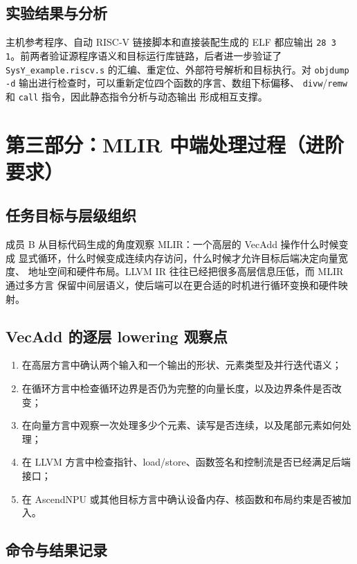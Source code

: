 \documentclass[a4paper]{article}
\begin{document}
\subsection{实验结果与分析}

主机参考程序、自动 RISC-V 链接脚本和直接装配生成的 ELF 都应输出
\texttt{28 3 1}。前两者验证源程序语义和目标运行库链路，后者进一步验证了
\texttt{SysY\_example.riscv.s} 的汇编、重定位、外部符号解析和目标执行。对
\texttt{objdump -d} 输出进行检查时，可以重新定位四个函数的序言、数组下标偏移、
\texttt{divw}/\texttt{remw} 和 \texttt{call} 指令，因此静态指令分析与动态输出
形成相互支撑。

\section{第三部分：MLIR 中端处理过程（进阶要求）}

\subsection{任务目标与层级组织}

成员 B 从目标代码生成的角度观察 MLIR：一个高层的 VecAdd 操作什么时候变成
显式循环，什么时候变成连续内存访问，什么时候才允许目标后端决定向量宽度、
地址空间和硬件布局。LLVM IR 往往已经把很多高层信息压低，而 MLIR 通过多方言
保留中间层语义，使后端可以在更合适的时机进行循环变换和硬件映射。

\subsection{VecAdd 的逐层 lowering 观察点}

\begin{enumerate}
  \item 在高层方言中确认两个输入和一个输出的形状、元素类型及并行迭代语义；
  \item 在循环方言中检查循环边界是否仍为完整的向量长度，以及边界条件是否改变；
  \item 在向量方言中观察一次处理多少个元素、读写是否连续，以及尾部元素如何处理；
  \item 在 LLVM 方言中检查指针、load/store、函数签名和控制流是否已经满足后端接口；
  \item 在 AscendNPU 或其他目标方言中确认设备内存、核函数和布局约束是否被加入。
\end{enumerate}

\subsection{命令与结果记录}
\end{document}
